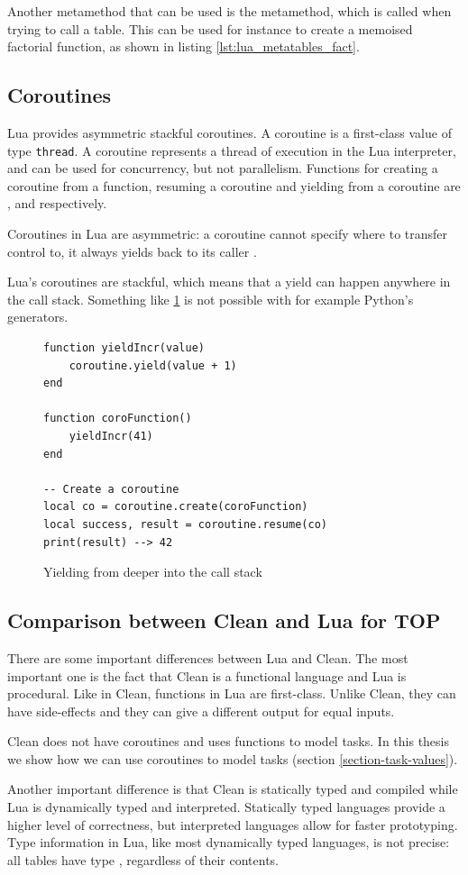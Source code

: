 Another metamethod that can be used is the  metamethod, which is called when trying to call a table. This can be used for instance to create a memoised factorial function, as shown in listing \ref{lst:lua_metatables_fact}.

\subsection{Coroutines}\label{section-lua-coroutines}
Lua provides asymmetric stackful coroutines. A coroutine is a first-class value of type \texttt{thread}. A coroutine represents a thread of execution in the Lua interpreter, and can be used for concurrency, but not parallelism. Functions for creating a coroutine from a function, resuming a coroutine and yielding from a coroutine are ,  and  respectively.

Coroutines in Lua are asymmetric: a coroutine cannot specify where to transfer control to, it always yields back to its caller \cite{moura2009revisiting}.

Lua's coroutines are stackful, which means that a yield can happen anywhere in the call stack. Something like \ref{lst:lua_coroutines} is not possible with for example Python's generators.

\begin{figure}[ht]
\centering
\begin{verbatim}
function yieldIncr(value)
    coroutine.yield(value + 1)
end

function coroFunction()
    yieldIncr(41)
end

-- Create a coroutine
local co = coroutine.create(coroFunction)
local success, result = coroutine.resume(co)
print(result) --> 42
\end{verbatim}
\caption{Yielding from deeper into the call stack}
\label{lst:lua_coroutines}
\end{figure}

\subsection{Comparison between Clean and Lua for TOP}
There are some important differences between Lua and Clean. The most important one is the fact that Clean is a functional language and Lua is procedural. Like in Clean, functions in Lua are first-class. Unlike Clean, they can have side-effects and they can give a different output for equal inputs.

Clean does not have coroutines and uses functions to model tasks. In this thesis we show how we can use coroutines to model tasks (section \ref{section-task-values}).

Another important difference is that Clean is statically typed and compiled while Lua is dynamically typed and interpreted. Statically typed languages provide a higher level of correctness, but interpreted languages allow for faster prototyping. Type information in Lua, like most dynamically typed languages, is not precise: all tables have type , regardless of their contents.

